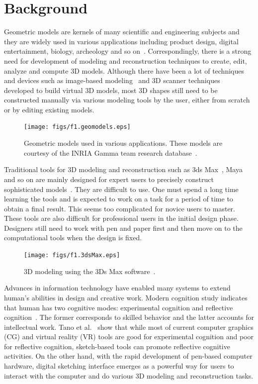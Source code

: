 \section{Background}\label{ch1:sec:background}

Geometric models are kernels of many scientific and engineering
subjects and they are widely used in various applications including
product design, digital entertainment, biology, archeology and so
on~\cite{BPKALBR07}. Correspondingly, there is a strong need for 
development of modeling and reconstruction techniques to create, 
edit, analyze and compute 3D models. Although there 
have been a lot of techniques and devices such as image-based modeling~\cite{DTM96,LTZYWK06} and 3D scanner techniques~\cite{LPCRK00,ZSCS04}
developed to build virtual 3D models, most 3D shapes still need to
be constructed manually via various modeling tools by the user,
either from scratch or by editing existing models.

\begin{figure} [htbp]
    \centering
  \texttt{[image: figs/f1.geomodels.eps]}
  \caption{Geometric models used in various applications. These models are courtesy of the INRIA Gamma team research database~\cite{INRIA}.}
\end{figure}

Traditional tools for 3D modeling and reconstruction such as 3ds Max~\cite{3DSMAX}, Maya~\cite{MAYA} and so on are mainly
designed for expert users to precisely construct sophisticated
models~\cite{CIW08}. They are difficult to use. One must spend a long time
learning the tools and is expected to work on a task for a period of
time to obtain a final result. This seems too complicated for novice
users to master. These tools are also difficult for professional
users in the initial design phase. Designers still need to work with
pen and paper first and then move on to the computational tools when
the design is fixed.

\begin{figure} [htbp]
    \centering
  \texttt{[image: figs/f1.3dsMax.eps]}
  \caption{3D modeling using the 3Ds Max software~\cite{3DSMAX}.}
\end{figure}

Advances in information technology have  enabled many systems to
extend human's abilities in design and creative work. Modern
cognition study indicates that human has two cognitive modes:
experimental cognition and reflective cognition~\cite{DN98}. The
former corresponds to skilled behavior and the latter accounts for
intellectual work. Tano et al.~\cite{TKNK03} show that while most of
current computer graphics (CG) and virtual reality (VR) tools are
good for experimental cognition and poor for reflective cognition,
sketch-based tools can promote reflective cognitive activities. On
the other hand, with the rapid development of pen-based computer
hardware, digital sketching interface emerges as a powerful way for
users to interact with the computer and do various 3D modeling and
reconstruction tasks.

